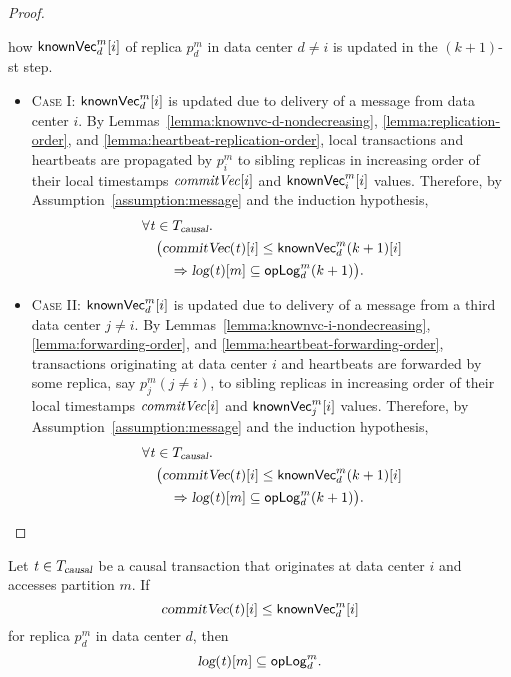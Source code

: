 \begin{proof}
\begin{itemize}
      how ${\sf knownVec}^{m}_{d}[i]$ of replica $p^{m}_{d}$ in data center $d \neq i$
      is updated in the $(k+1)$-st step.
      \begin{itemize}
        \item \textsc{Case I:}
          ${\sf knownVec}^{m}_{d}[i]$ is updated due to delivery of a message
          from data center $i$.
          By Lemmas~\ref{lemma:knownvc-d-nondecreasing},
          \ref{lemma:replication-order}, and \ref{lemma:heartbeat-replication-order},
          local transactions and heartbeats are propagated by $p^{m}_{i}$ to sibling replicas
          in increasing order of their local timestamps $\mathit{commitVec}[i]$
          and ${\sf knownVec}^{m}_{i}[i]$ values.
          Therefore, by Assumption~\ref{assumption:message}
          and the induction hypothesis,
          \begin{align*}
            &\forall \tvar \in \causaltxs.\; \\
              &\quad \big(\commitVC(\tvar)[i] \le \knownVC^{m}_{d}(k+1)[i] \\
              &\quad\quad \implies \log(\tvar)[m] \subseteq \oplog^{m}_{d}(k+1)\big).
          \end{align*}
        \item \textsc{Case II:}
          ${\sf knownVec}^{m}_{d}[i]$ is updated due to delivery of a message
          from a third data center $j \neq i$.
          By Lemmas~\ref{lemma:knownvc-i-nondecreasing},
          \ref{lemma:forwarding-order}, and \ref{lemma:heartbeat-forwarding-order},
          transactions originating at data center $i$ and heartbeats are forwarded
          by some replica, say $p^{m}_{j} (j \neq i)$,
          to sibling replicas in increasing order of
          their local timestamps $\mathit{commitVec}[i]$ and ${\sf knownVec}^{m}_{j}[i]$ values.
          Therefore, by Assumption~\ref{assumption:message}
          and the induction hypothesis,
          \begin{align*}
            &\forall \tvar \in \causaltxs.\; \\
              &\quad \big(\commitVC(\tvar)[i] \le \knownVC^{m}_{d}(k+1)[i] \\
                &\quad\quad \implies \log(\tvar)[m] \subseteq \oplog^{m}_{d}(k+1)\big).
          \end{align*}
      \end{itemize}
  \end{itemize}
\end{proof}

\begin{applemma}[\prop{1}] \label{lemma:knownvc-causal}
  Let $\mathit{t} \in T_{\textsl{causal}}$ be a causal transaction
  that originates at data center $i$
  and accesses partition $m$.
  If
  \[
    \textsl{commitVec}(\mathit{t})[i] \le {\sf knownVec}^{m}_{d}[i]
  \]
  for replica $p^{m}_{d}$ in data center $d$,
  then
  \[
    \textsl{log}(\mathit{t})[m] \subseteq {\sf opLog}^{m}_{d}.
  \]
\end{applemma}

